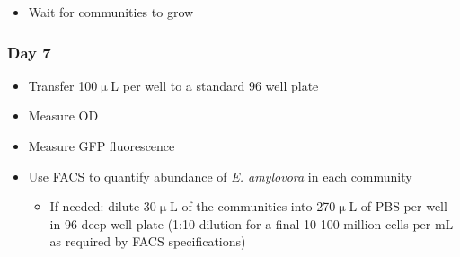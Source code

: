 \documentclass[a4paper,10pt]{article}
\begin{document}
\begin{itemize}[label=\Square]

\item Wait for communities to grow

\end{itemize}

\subsubsection*{Day 7}

\begin{itemize}[label=\Square]

\item Transfer 100$\upmu$L per well to a standard 96 well plate
\item Measure OD
\item Measure GFP fluorescence
\item Use FACS to quantify abundance of \textit{E. amylovora} in each community
\begin{itemize}[label=\Square]
\item If needed: dilute 30$\upmu$L of the communities into 270$\upmu$L of PBS
per well in 96 deep well plate (1:10 dilution for a final 10-100 million cells
per mL as required by FACS specifications)
\end{itemize}


\end{itemize}
\end{document}
